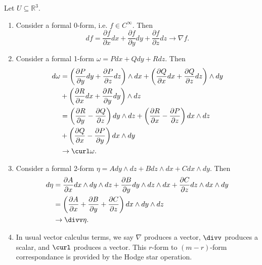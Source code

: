 \documentclass[../main.tex]{subfiles}
\begin{document}
    \begin{remark}
        Let \(U \subseteq \mathbb{R}^3\).
        \begin{enumerate}
            \item Consider a formal 0-form, i.e. \(f \in C^\infty\). Then 
            \[
            df = \frac{\partial f}{\partial x}dx+\frac{\partial f}{\partial y}dy 
            + \frac{\partial f}{\partial z}dz \rightarrow \nabla f.
            \]
            \item Consider a formal 1-form \(\omega = Pdx+Qdy+Rdz\). Then 
            \[
            \begin{aligned}
                d\omega &= \left(\frac{\partial P}{\partial y}dy+
                \frac{\partial P}{\partial z}dz\right)\wedge dx + 
                \left(\frac{\partial Q}{\partial x}dx+
                \frac{\partial Q}{\partial z}dz\right)\wedge dy \\
                        &+\left(\frac{\partial R}{\partial x}dx+
                \frac{\partial R}{\partial y}dy\right)\wedge dz \\
                &=\left(\frac{\partial R}{\partial y}-
                \frac{\partial Q}{\partial z}\right)dy\wedge dz + 
                \left(\frac{\partial R}{\partial x}-
                \frac{\partial P}{\partial z}\right)dx\wedge dz \\
                &+\left(\frac{\partial Q}{\partial x}-
                \frac{\partial P}{\partial y}\right)dx\wedge dy \\
                &\rightarrow \curl \omega.
            \end{aligned}
            \]
            \item Consider a formal 2-form \(\eta = A dy\wedge dz + B dz \wedge dx + 
            C dx \wedge dy\). Then 
            \[
            \begin{aligned}
                d\eta &= \frac{\partial A}{\partial x}dx\wedge dy\wedge dz + 
                \frac{\partial B}{\partial y}dy\wedge dz\wedge dx + 
                \frac{\partial C}{\partial z}dz\wedge dx\wedge dy \\
                &= \left(\frac{\partial A}{\partial x} + 
                \frac{\partial B}{\partial y} + 
                \frac{\partial C}{\partial z} \right)dx\wedge dy\wedge dz \\
                &\rightarrow \divv \eta.
            \end{aligned}
            \]
            \item In usual vector calculus terms, we say \(\nabla\) produces a 
            vector, \(\divv\) produces a scalar, and \(\curl\) produces a vector.
            This \(r\)-form to \((m-r)\)-form correspondance is provided by 
            the Hodge star operation.
        \end{enumerate}
    \end{remark}
\end{document}
